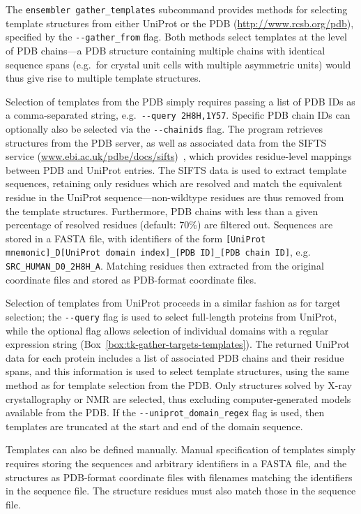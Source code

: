 \documentclass[aps,prl,preprint,nofootinbib,superscriptaddress,linenumbers]{revtex4-1}
\begin{document}
The {\tt ensembler gather\_templates} subcommand provides methods for selecting template structures from either UniProt or the PDB (\url{http://www.rcsb.org/pdb}), specified by the {\tt -{}-gather\_from} flag.
Both methods select templates at the level of PDB chains---a PDB structure containing multiple chains with identical sequence spans (e.g.~for crystal unit cells with multiple asymmetric units) would thus give rise to multiple template structures.

Selection of templates from the PDB simply requires passing a list of PDB IDs as a comma-separated string, e.g.~{\tt -{}-query 2H8H,1Y57}.
Specific PDB chain IDs can optionally also be selected via the {\tt -{}-chainids} flag.
The program retrieves structures from the PDB server, as well as associated data from the SIFTS service (\href{http://www.ebi.ac.uk/pdbe/docs/sifts/}{www.ebi.ac.uk/pdbe/docs/sifts})~\cite{velankar:2013:sifts}, which provides residue-level mappings between PDB and UniProt entries.
The SIFTS data is used to extract template sequences, retaining only residues which are resolved and match the equivalent residue in the UniProt sequence---non-wildtype residues are thus removed from the template structures.
Furthermore, PDB chains with less than a given percentage of resolved residues (default: 70\%) are filtered out.
Sequences are stored in a FASTA file, with identifiers of the form {\tt [UniProt mnemonic]\_D[UniProt domain index]\_[PDB ID]\_[PDB chain ID]}, e.g. {\tt SRC\_HUMAN\_D0\_2H8H\_A}.
Matching residues then extracted from the original coordinate files and stored as PDB-format coordinate files.

Selection of templates from UniProt proceeds in a similar fashion as for target selection; the {\tt -{}-query} flag is used to select full-length proteins from UniProt, while the optional  flag allows selection of individual domains with a regular expression string (Box~\ref{box:tk-gather-targets-templates}).
The returned UniProt data for each protein includes a list of associated PDB chains and their residue spans, and this information is used to select template structures, using the same method as for template selection from the PDB.
Only structures solved by X-ray crystallography or NMR are selected, thus excluding computer-generated models available from the PDB.
If the {\tt -{}-uniprot\_domain\_regex} flag is used, then templates are truncated at the start and end of the domain sequence.

Templates can also be defined manually.
Manual specification of templates simply requires storing the sequences and arbitrary identifiers in a FASTA file, and the structures as PDB-format coordinate files with filenames matching the identifiers in the sequence file.
The structure residues must also match those in the sequence file.
\end{document}
